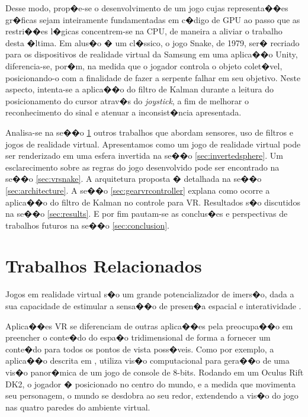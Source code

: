 \documentclass[12pt]{article}
\begin{document}
Desse modo, prop�e-se o desenvolvimento de um jogo cujas representa��es gr�ficas sejam inteiramente fundamentadas em c�digo de GPU ao passo que as restri��es l�gicas concentrem-se na CPU, de maneira a aliviar o trabalho desta �ltima. Em alus�o � um cl�ssico, o jogo Snake, de 1979, ser� recriado para os dispositivos de realidade virtual da Samsung em uma aplica��o Unity, diferencia-se, por�m, na medida que o jogador controla o objeto colet�vel, posicionando-o com a finalidade de fazer a serpente falhar em seu objetivo. Neste aspecto, intenta-se a aplica��o do filtro de Kalman durante a leitura do posicionamento do cursor atrav�s do \textit{joystick}, a fim de melhorar o reconhecimento do sinal e atenuar a inconsist�ncia apresentada. 

Analisa-se na se��o \ref{sec:relatedworks} outros trabalhos que abordam sensores, uso de filtros e jogos de realidade virtual. Apresentamos como um jogo de realidade virtual pode ser renderizado em uma esfera invertida na se��o \ref{sec:invertedsphere}. Um esclarecimento sobre as regras do jogo desenvolvido pode ser encontrado na se��o \ref{sec:vrsnake}. A arquitetura proposta � detalhada na se��o \ref{sec:architecture}. A se��o \ref{sec:gearvrcontroller} explana como ocorre a aplica��o do filtro de Kalman no controle para VR. Resultados s�o discutidos na se��o \ref{sec:results}. E por fim pautam-se as conclus�es e perspectivas de trabalhos futuros na se��o \ref{sec:conclusion}.

\section{Trabalhos Relacionados} \label{sec:relatedworks}

Jogos em realidade virtual s�o um grande potencializador de imers�o, dada a sua capacidade de estimular a sensa��o de presen�a espacial e interatividade \cite{seibert2017control}.

Aplica��es VR se diferenciam de outras aplica��es pela preocupa��o em preencher o conte�do do espa�o tridimensional de forma a fornecer um conte�do para todos os pontos de vista poss�veis. Como por exemplo, a aplica��o descrita em \cite{zund2015unfolding}, utiliza vis�o computacional para gera��o de uma vis�o panor�mica de um jogo de console de 8-bits. Rodando em um Oculus Rift DK2, o jogador � posicionado no centro do mundo, e a medida que movimenta seu personagem, o mundo se desdobra ao seu redor, extendendo a vis�o do jogo nas quatro paredes do ambiente virtual.
\end{document}
